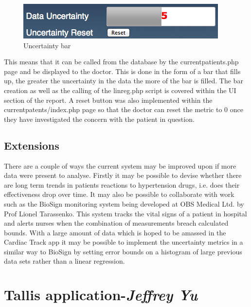 \documentclass[11pt]{article}
\begin{document}
\begin{figure}
\centering
\includegraphics[scale=0.35]{unbar.png}
\caption{Uncertainty bar} 
\end{figure} 
This means that it can be called from the database by the currentpatients.php page and be displayed to the doctor. This is done in the form of a bar that fills up, the greater the uncertainty in the data the more of the bar is filled. The bar creation as well as the calling of the linreg.php script is covered within the UI section of the report. A reset button was also implemented within the currentpatents/index.php page so that the doctor can reset the metric to 0 once they have investigated the concern with the patient in question. 

\subsection{Extensions}
There are a couple of ways the current system may be improved upon if more data were present to analyse. Firstly it may be possible to devise whether there are long term trends in patients reactions to hypertension drugs, i.e. does their effectiveness drop over time. It may also be possible to collaborate with work such as the BioSign monitoring system being developed at OBS Medical Ltd.\cite{OBS} by Prof Lionel Tarassenko. This system tracks the vital signs of a patient in hospital and alerts nurses when the combination of measurements breach calculated bounds. With a large amount of data which is hoped to be amassed in the Cardiac Track app it may be possible to implement the uncertainty metrics in a similar way to BioSign by setting error bounds on a histogram of large previous data sets rather than a linear regression. 


\section{Tallis application-\textit{Jeffrey Yu}}
\end{document}

